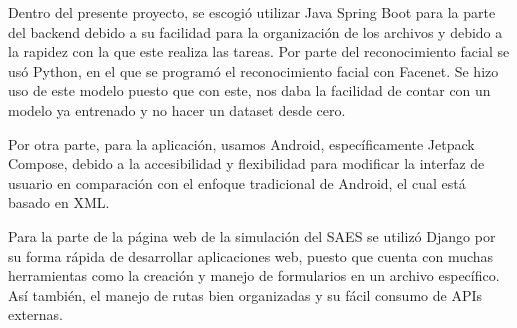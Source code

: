 \newpage
Dentro del presente proyecto, se escogió utilizar Java Spring Boot para la parte del backend debido a su facilidad para la organización de los archivos y debido a la rapidez con la que este realiza las tareas. Por parte del reconocimiento facial se usó Python, en el que se programó el reconocimiento facial con Facenet. Se hizo uso de este modelo puesto que con este, nos daba la facilidad de contar con un modelo ya entrenado y no hacer un dataset desde cero. 

Por otra parte, para la aplicación, usamos Android, específicamente Jetpack Compose, debido a la accesibilidad y flexibilidad para modificar la interfaz de usuario en comparación con el enfoque tradicional de Android, el cual está basado en XML.

Para la parte de la página web de la simulación del SAES se utilizó Django por su forma rápida de desarrollar aplicaciones web, puesto que cuenta con muchas herramientas como la creación y manejo de formularios en un archivo específico. Así también, el manejo de rutas bien organizadas y su fácil consumo de APIs externas.